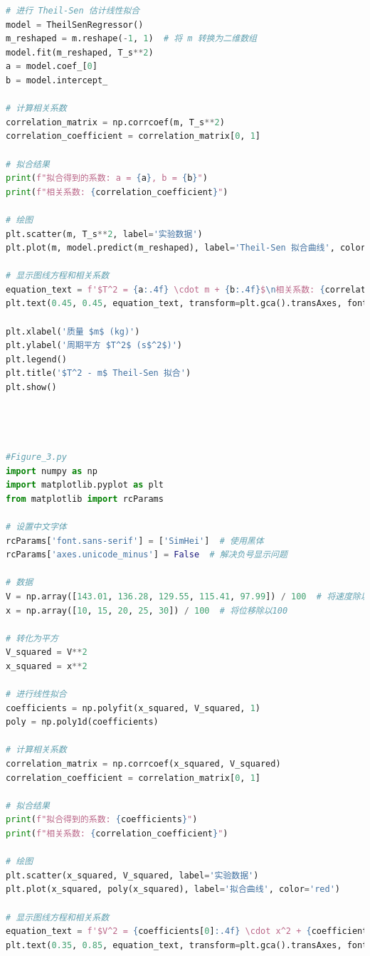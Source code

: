 \documentclass[UTF8]{article}
\theoremstyle{MyLineTheoremStyle} %
\theoremstyle{MyBlockTheoremStyle} %
\theoremstyle{MySubsubsectionStyle} %
\begin{document}
\begin{lstlisting}[language=Python, caption=Figure's Python code, label=code:python_example]
# 进行 Theil-Sen 估计线性拟合
model = TheilSenRegressor()
m_reshaped = m.reshape(-1, 1)  # 将 m 转换为二维数组
model.fit(m_reshaped, T_s**2)
a = model.coef_[0]
b = model.intercept_

# 计算相关系数
correlation_matrix = np.corrcoef(m, T_s**2)
correlation_coefficient = correlation_matrix[0, 1]

# 拟合结果
print(f"拟合得到的系数: a = {a}, b = {b}")
print(f"相关系数: {correlation_coefficient}")

# 绘图
plt.scatter(m, T_s**2, label='实验数据')
plt.plot(m, model.predict(m_reshaped), label='Theil-Sen 拟合曲线', color='red')

# 显示图线方程和相关系数
equation_text = f'$T^2 = {a:.4f} \cdot m + {b:.4f}$\n相关系数: {correlation_coefficient:.4f}'
plt.text(0.45, 0.45, equation_text, transform=plt.gca().transAxes, fontsize=12, verticalalignment='top')

plt.xlabel('质量 $m$ (kg)')
plt.ylabel('周期平方 $T^2$ (s$^2$)')
plt.legend()
plt.title('$T^2 - m$ Theil-Sen 拟合')
plt.show()




#Figure_3.py
import numpy as np
import matplotlib.pyplot as plt
from matplotlib import rcParams

# 设置中文字体
rcParams['font.sans-serif'] = ['SimHei']  # 使用黑体
rcParams['axes.unicode_minus'] = False  # 解决负号显示问题

# 数据
V = np.array([143.01, 136.28, 129.55, 115.41, 97.99]) / 100  # 将速度除以100
x = np.array([10, 15, 20, 25, 30]) / 100  # 将位移除以100

# 转化为平方
V_squared = V**2
x_squared = x**2

# 进行线性拟合
coefficients = np.polyfit(x_squared, V_squared, 1)
poly = np.poly1d(coefficients)

# 计算相关系数
correlation_matrix = np.corrcoef(x_squared, V_squared)
correlation_coefficient = correlation_matrix[0, 1]

# 拟合结果
print(f"拟合得到的系数: {coefficients}")
print(f"相关系数: {correlation_coefficient}")

# 绘图
plt.scatter(x_squared, V_squared, label='实验数据')
plt.plot(x_squared, poly(x_squared), label='拟合曲线', color='red')

# 显示图线方程和相关系数
equation_text = f'$V^2 = {coefficients[0]:.4f} \cdot x^2 + {coefficients[1]:.4f}$\n相关系数: {correlation_coefficient:.4f}'
plt.text(0.35, 0.85, equation_text, transform=plt.gca().transAxes, fontsize=12, verticalalignment='top')


\end{lstlisting}
\end{document}
